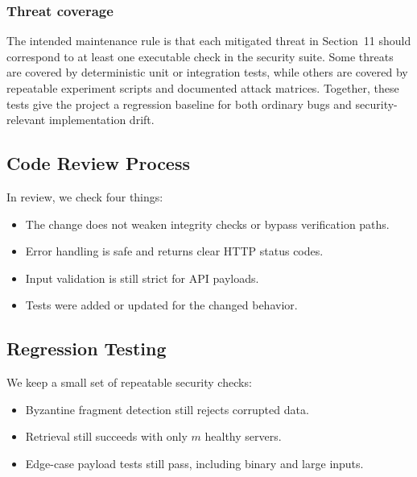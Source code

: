 \documentclass[../veristore_security_model.tex]{subfiles}
\begin{document}
\subsubsection{Threat coverage}
The intended maintenance rule is that each mitigated threat in Section~11 should correspond to at least one executable check in the security suite. Some threats are covered by deterministic unit or integration tests, while others are covered by repeatable experiment scripts and documented attack matrices. Together, these tests give the project a regression baseline for both ordinary bugs and security-relevant implementation drift.

\subsection{Code Review Process}

In review, we check four things:
\begin{itemize}
    \item The change does not weaken integrity checks or bypass verification paths.
    \item Error handling is safe and returns clear HTTP status codes.
    \item Input validation is still strict for API payloads.
    \item Tests were added or updated for the changed behavior.
\end{itemize}

\subsection{Regression Testing}

We keep a small set of repeatable security checks:
\begin{itemize}
    \item Byzantine fragment detection still rejects corrupted data.
    \item Retrieval still succeeds with only $m$ healthy servers.
    \item Edge-case payload tests still pass, including binary and large inputs.
\end{itemize}

\newpage
\end{document}
